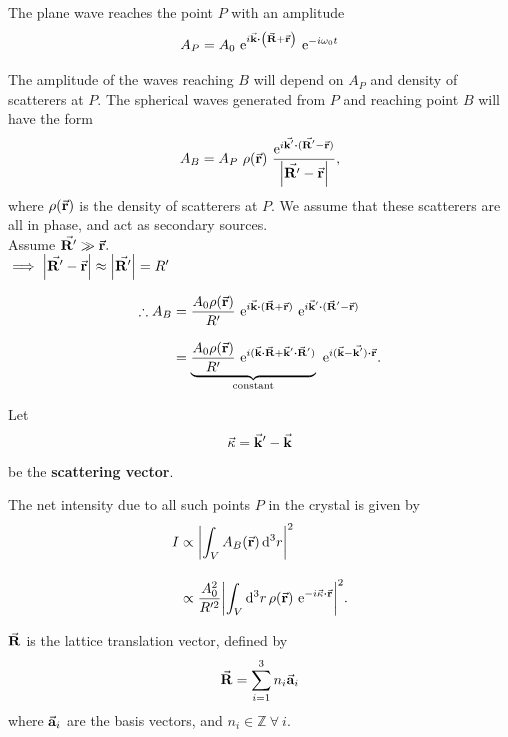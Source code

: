 	The plane wave reaches the point $P$ with an amplitude%
%		
		\begin{equation}
		A_P = A_0 ~ \e{i \va{k} \vdot \qty( \va{R} + \va{r} )} ~ \e{-i \omega_0 t}
		\end{equation}

	The amplitude of the waves reaching $B$ will depend on $A_P$ and density of scatterers at $P.$ The spherical waves generated from $P$ and reaching point $B$ will have the form%
%		
		\begin{equation}
		A_B = A_P ~ \rho(\va{r}) ~ \dfrac{\e{i \va{k'} \vdot ( \va{R'} - \va{r} ) }}{\abs{ \va{R'} - \va{r} }},
		\end{equation}%
%		
	where $\rho(\va{r})$ is the density of scatterers at $P.$ We assume that these scatterers are all in phase, and act as secondary sources.\\
	
	Assume $\va{R'} \gg \va{r}.$\\[0.8em]
	$\implies \abs{ \va{R'} - \va{r} } \approx \abs{\va{R'}} = R'$
	
	\begin{align}
	\therefore A_B &= \dfrac{A_0 \rho(\va{r})}{R'} ~ \e{i \va{k} \vdot ( \va{R} + \va{r} )} ~ \e{ i \va{k}' \vdot (  \va{R}' - \va{r}) } \nonumber \\[0.8em]
		&= \underbrace{\dfrac{A_0 \rho(\va{r})}{R'} ~ \e{ i ( \va{k} \vdot \va{R} + \va{k}' \vdot \va{R}' ) }}_{\text{constant}} ~ \e{i ( \va{k} - \va{k'} ) \vdot \va{r}}.
	\end{align}
	
	Let%
%		
		\begin{equation}
		\va{\kappa} = \va{k}' - \va{k}
		\end{equation}%
%		
	be the \textbf{scattering vector}.
	
	The net intensity due to all such points $P$ in the crystal is given by%
%		
		\begin{align}
		I &\propto \abs{ \int_V A_B(\va{r}) \dd[3]{r} }^2 \nonumber \\[1em]
		  &\propto \dfrac{A_0^2}{R'^2} \abs{ \int_V \dd[3]{r} \rho(\va{r}) ~ \e{ - i \va{\kappa} \vdot \va{r} } }  ^2. \label{eq:net_I}
		\end{align}
		
	$\va{R}$ is the lattice translation vector, defined by%
%		
	\begin{equation}
	\va{R} = \sum_{i=1}^3 n_i \va{a}_i
	\end{equation}%
%	
	where $\va{a}_i$ are the basis vectors, and $n_i \in \mathbb{Z} ~ \forall ~ i.$
	
